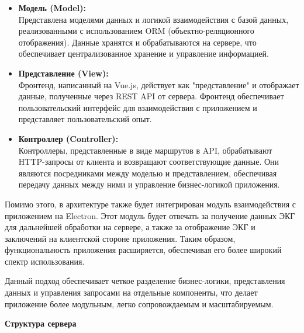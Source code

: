 \documentclass[12pt, russian]{extarticle}
\begin{document}
\begin{spacing}{1.5}
\begin{itemize}
    \item \textbf{Модель (Model):} \\
        Представлена моделями данных и логикой взаимодействия с базой данных, реализованными с использованием ORM (объектно-реляционного отображения). Данные хранятся и обрабатываются на сервере, что обеспечивает централизованное хранение и управление информацией.
    \item \textbf{Представление (View):} \\
        Фронтенд, написанный на Vue.js, действует как "представление" и отображает данные, полученные через REST API от сервера. Фронтенд обеспечивает пользовательский интерфейс для взаимодействия с приложением и представляет пользовательский опыт.
    \item \textbf{Контроллер (Controller):} \\
        Контроллеры, представленные в виде маршрутов в API, обрабатывают HTTP-запросы от клиента и возвращают соответствующие данные. Они являются посредниками между моделью и представлением, обеспечивая передачу данных между ними и управление бизнес-логикой приложения.
\end{itemize}

Помимо этого, в архитектуре также будет интегрирован модуль взаимодействия с приложением на Electron. Этот модуль будет отвечать за получение данных ЭКГ для дальнейшей обработки на сервере, а также за отображение ЭКГ и заключений на клиентской стороне приложения. Таким образом, функциональность приложения расширяется, обеспечивая его более широкий спектр использования.

Данный подход обеспечивает четкое разделение бизнес-логики, представления данных и управления запросами на отдельные компоненты, что делает приложение более модульным, легко сопровождаемым и масштабируемым.

\par \noindent \textbf{Структура сервера}


\end{spacing}
\end{document}
